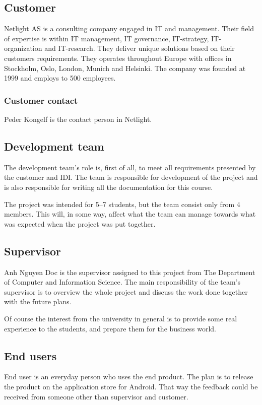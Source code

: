 \subsection{Customer}
Netlight AS is a consulting company engaged in IT and management. Their field of expertise is within IT management, IT governance, IT-strategy, IT-organization and IT-research. They deliver unique solutions based on their customers requirements. They operates throughout Europe with offices in Stockholm, Oslo, London, Munich and Helsinki. The company was founded at 1999 and employs to 500 employees. 
\subsubsection{Customer contact}
Peder Kongelf is the contact person in Netlight.

\subsection{Development team}
The development team's role is, first of all, to meet all requirements presented by the customer and IDI. 
The team is responsible for development of the project and is also responsible for writing all the documentation for this course.  
 
The project was intended for 5--7 students, but the team consist only from 4 members. 
This will, in some way, affect what the team can manage towards what was expected when the project was put together.

\subsection{Supervisor}

Anh Nguyen Doc is the supervisor assigned to this project from The Department of Computer and Information Science. 
The main responsibility of the team's supervisor is to overview the whole project and discuss the work done together with the future plans. 

Of course the interest from the university in general is to provide some real experience to the students, and prepare them for the business world.

\subsection{End users}
End user is an everyday person who uses the end product. The plan is to release the product on the application store for Android. That way the feedback could be received from someone other than supervisor and customer. 

